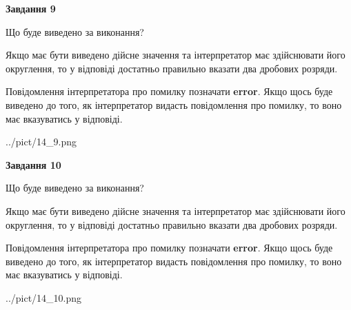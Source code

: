 \documentclass[12pt, ukrainian]{article}
\begin{document}
{\begin {Large}
{\begin {center}\textbf{Завдання 9}\end {center}}\par
Що буде виведено за виконання? \par

Якщо має бути виведено дійсне значення та інтерпретатор має здійснювати його округлення, 
то у відповіді достатньо правильно вказати два дробових розряди.

Повідомлення інтерпретатора про помилку позначати \textbf{error}.
Якщо щось буде виведено до того, як інтерпретатор видасть повідомлення про помилку, 
то воно має вказуватись у відповіді. \par

\begin{center}
	{../pict/14_9.png}
\end{center}
\newpage

{\begin {center}\textbf{Завдання 10}\end {center}}\par
Що буде виведено за виконання? \par

Якщо має бути виведено дійсне значення та інтерпретатор має здійснювати його округлення, 
то у відповіді достатньо правильно вказати два дробових розряди.

Повідомлення інтерпретатора про помилку позначати \textbf{error}.
Якщо щось буде виведено до того, як інтерпретатор видасть повідомлення про помилку, 
то воно має вказуватись у відповіді. \par

\begin{center}
	{../pict/14_10.png}
\end{center}
\newpage

\end {Large}}
\end{document}
